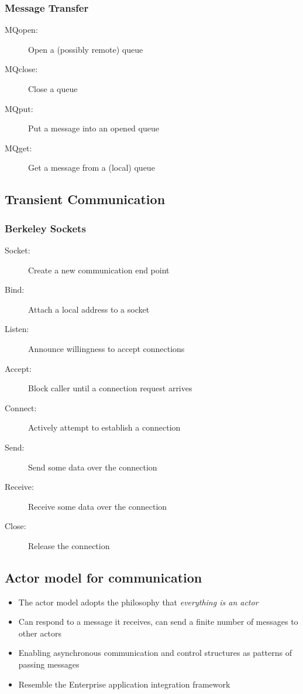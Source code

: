 \subsubsection{Message Transfer}
\begin{description}
	\item[MQopen:] Open a (possibly remote) queue
	\item[MQclose:] Close a queue
	\item[MQput:] Put a message into an opened queue
	\item[MQget:] Get a message from a (local) queue	
\end{description}

\subsection{Transient Communication}
\subsubsection{Berkeley Sockets}
\begin{description}
	\item[Socket:] Create a new communication end point
	\item[Bind:] Attach a local address to a socket
	\item[Listen:] Announce willingness to accept connections
	\item[Accept:] Block caller until a connection request arrives
	\item[Connect:] Actively attempt to establish a connection
	\item[Send:] Send some data over the connection
	\item[Receive:] Receive some data over the connection
	\item[Close:] Release the connection
\end{description}

\subsection{Actor model for communication}
\begin{itemize}
	\item The actor model adopts the philosophy that \textit{everything is an actor}
	\item Can respond to a message it receives, can send a finite number of messages to other actors
	\item Enabling asynchronous communication and control structures as patterns of passing messages
	\item Resemble the Enterprise application integration framework	
\end{itemize}

